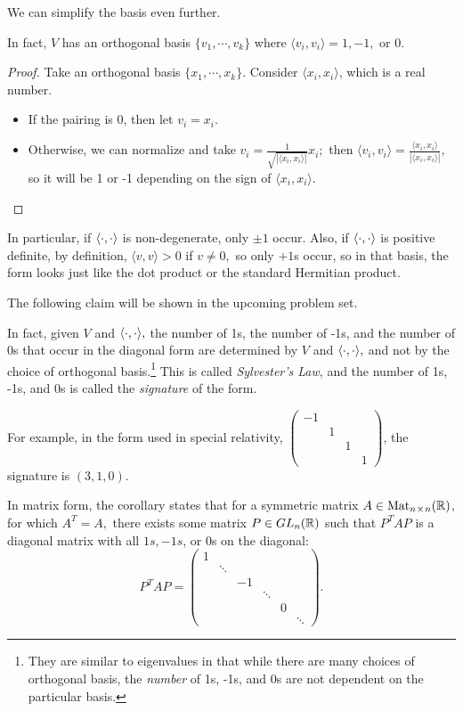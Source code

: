 We can simplify the basis even further.
\begin{corollary}
In fact, $V$ has an orthogonal basis $\{v_1, \cdots, v_k\}$ where $\langle v_i, v_i\rangle = 1, -1,$ or 0. 
\end{corollary}
\begin{proof}
Take an orthogonal basis $\{x_1, \cdots, x_k\}$. Consider $\langle x_i, x_i \rangle$, which is a real number.
\begin{itemize}
    \item If the pairing is 0, then let $v_i = x_i.$
    \item Otherwise, we can normalize and take $v_i = \frac{1}{\sqrt{|\langle x_i, x_i \rangle|}}x_i;$ then $\langle v_i, v_i \rangle = \frac{\langle x_i, x_i \rangle}{|\langle x_i, x_i \rangle|},$ so it will be 1 or -1 depending on the sign of $\langle x_i, x_i \rangle.$
\end{itemize}
\end{proof}

In particular, if $\langle \cdot, \cdot \rangle$ is non-degenerate, only $\pm 1$ occur. Also, if $\langle \cdot, \cdot \rangle$ is positive definite, by definition, $\langle v, v \rangle > 0$ if $v \neq 0,$ so only $+1$s occur, so in that basis, the form looks just like the dot product or the standard Hermitian product.

The following claim will be shown in the upcoming problem set.

\begin{claim}
In fact, given $V$ and $\langle \cdot, \cdot \rangle,$ the number of 1s, the number of -1s, and the number of 0s that occur in the diagonal form are determined by $V$ and $\langle \cdot, \cdot \rangle,$ and not by the choice of orthogonal basis.\footnote{They are similar to eigenvalues in that while there are many choices of orthogonal basis, the \emph{number} of 1s, -1s, and 0s are not dependent on the particular basis.} This is called \emph{Sylvester's Law}, and the number of 1s, -1s, and 0s is called the \emph{signature} of the form. 
\end{claim}

For example, in the form used in special relativity, $\begin{pmatrix}-1 & & & \\ & 1 & & \\ & & 1 & \\ & & & 1\end{pmatrix}$, the signature is $(3, 1, 0).$

In matrix form, the corollary states that for a symmetric matrix $A \in \text{Mat}_{n \hspace{0.05em}{\times}\hspace{0.05em} n}(\mathbb R)$, for which $A^T = A,$ there exists some matrix $P \in GL_n(\mathbb R)$ such that $P^TAP$ is a diagonal matrix with all $1s, -1s$, or 0s on the diagonal:
\[
P^TAP = \begin{pmatrix} 1 & & & & & \\ & \ddots & & & &  \\ & & -1 & & &  \\ & & & \ddots & & \\ & & & & 0 & \\ & & & & & \ddots \end{pmatrix}.
\]


